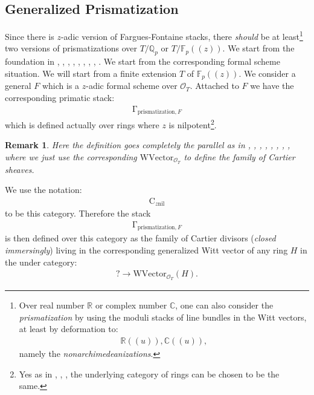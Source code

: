 \documentclass[12pt]{article}
\newtheorem{remark}{Remark}
\theoremstyle{definition}
\begin{document}
\subsection{Generalized Prismatization}
Since there is $z$-adic version of Fargues-Fontaine stacks, there \textit{should} be at least\footnote{Over real number $\mathbb{R}$ or complex number $\mathbb{C}$, one can also consider the \textit{prismatization} by using the moduli stacks of line bundles in the Witt vectors, at least by deformation to:
\begin{align}
\mathbb{R}((u)), \mathbb{C}((u)),
\end{align}
namely the \textit{nonarchimedeanizations}.} two versions of prismatizations over $T/\mathbb{Q}_p$ or $T/\mathbb{F}_p((z))$. We start from the foundation in \cite{BSI}, \cite{BLI}, \cite{DI}, \cite{SchI}, \cite{ALBRCS}, \cite{TI}, \cite{TII}, \cite{TIII}, \cite{TVI}. We start from the corresponding formal scheme situation. We will start from a finite extension $T$ of $\mathbb{F}_p((z))$. We consider a general $F$ which is a $z$-adic formal scheme over $\mathcal{O}_T$. Attached to $F$ we have the corresponding primatic stack:
\begin{align}
\mathrm{\Gamma}_{\mathrm{prismatization},F}
\end{align}  
which is defined actually over rings where $z$ is nilpotent\footnote{Yes as in \cite{KLI}, \cite{KLII}, \cite{FS}, \cite{SchII} the underlying category of rings can be chosen to be the same.}. 
\begin{remark}
Here the definition goes completely the parallel as in \cite{BSI}, \cite{BLI}, \cite{DI}, \cite{SchI}, \cite{ALBRCS}, \cite{TI}, \cite{TII}, \cite{TIII}, \cite{TVI} where we just use the corresponding $\mathrm{WVector}_{\mathcal{O}_T}$ to define the family of Cartier sheaves. 
\end{remark}
We use the notation:
\begin{align}
\mathrm{C}_{z\mathrm{nil}} 
\end{align}
to be this category. Therefore the stack
\begin{align}
\mathrm{\Gamma}_{\mathrm{prismatization},F}
\end{align} 
is then defined over this category as the family of Cartier divisors (\textit{closed immersingly}) living in the corresponding generalized Witt vector of any ring $H$ in the under category:
\begin{align}
?\rightarrow \mathrm{WVector}_{\mathcal{O}_T}(H).
\end{align}
\end{document}
